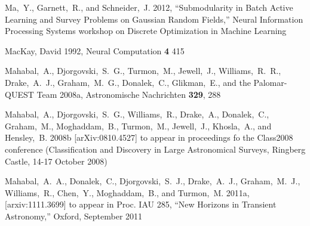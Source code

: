 \documentclass[prd,nofootbib,floatfix,11pt,tightenlines]{revtex4}
\begin{document}
\begin{thebibliography}{99}




Ma,~Y., Garnett,~R., and Schneider,~J. 2012,
``Submodularity in Batch Active Learning and Survey Problems
on Gaussian Random Fields,''
Neural Information Processing Systems 
workshop on Discrete Optimization in Machine Learning

MacKay, David 1992, Neural Computation {\bf 4} 415

Mahabal,~A., Djorgovski,~S.~G., Turmon,~M., Jewell,~J., Williams,~R.~R.,
Drake,~A.~J., Graham,~M.~G., Donalek,~C., Glikman,~E., and the Palomar-QUEST Team
2008a, Astronomische Nachrichten {\bf 329}, 288

Mahabal,~A., Djorgovski,~S.~G., Williams,~R., Drake,~A., Donalek,~C.,
Graham,~M., Moghaddam,~B., Turmon,~M., Jewell,~J., Khosla,~A., and
Hensley,~B. 2008b [arXiv:0810.4527] to appear in proceedings fo the Class2008
conference (Classification and Discovery in Large Astronomical Surveys, Ringberg
Castle, 14-17 October 2008)

Mahabal,~A.~A., Donalek,~C., Djorgovski,~S.~J., Drake,~A.~J.,
Graham,~M.~J., Williams,~R., Chen,~Y., Moghaddam,~B., and Turmon,~M.
2011a, [arxiv:1111.3699] to appear in Proc. IAU 285, ``New Horizons in Transient
Astronomy,'' Oxford, September 2011




\end{thebibliography}
\end{document}

